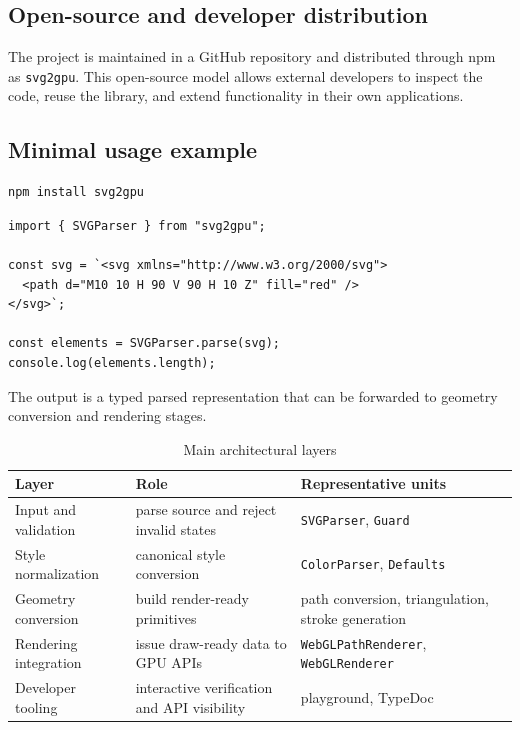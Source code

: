 \subsection{Open-source and developer distribution}

The project is maintained in a GitHub repository and distributed through npm as \texttt{svg2gpu}.
This open-source model allows external developers to inspect the code, reuse the library, and extend functionality in their own applications.

\subsection{Minimal usage example}

\begin{verbatim}
npm install svg2gpu
\end{verbatim}

\begin{verbatim}
import { SVGParser } from "svg2gpu";

const svg = `<svg xmlns="http://www.w3.org/2000/svg">
  <path d="M10 10 H 90 V 90 H 10 Z" fill="red" />
</svg>`;

const elements = SVGParser.parse(svg);
console.log(elements.length);
\end{verbatim}

The output is a typed parsed representation that can be forwarded to geometry conversion and rendering stages.

\begin{table}[htbp]
\centering
\caption{Main architectural layers}
\label{tab:architecture_layers_compact}
\begin{tabular}{>{\raggedright\arraybackslash}p{3.2cm} >{\raggedright\arraybackslash}p{5.0cm} >{\raggedright\arraybackslash}p{4.8cm}}
\toprule
\textbf{Layer} & \textbf{Role} & \textbf{Representative units} \\
\midrule
Input and validation & parse source and reject invalid states & \texttt{SVGParser}, \texttt{Guard} \\
Style normalization & canonical style conversion & \texttt{ColorParser}, \texttt{Defaults} \\
Geometry conversion & build render-ready primitives & path conversion, triangulation, stroke generation \\
Rendering integration & issue draw-ready data to GPU APIs & \texttt{WebGLPathRenderer}, \texttt{WebGLRenderer} \\
Developer tooling & interactive verification and API visibility & playground, TypeDoc \\
\bottomrule
\end{tabular}
\end{table}

